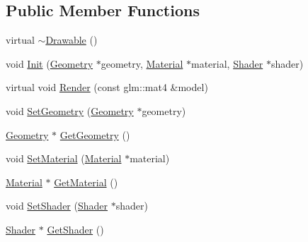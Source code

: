 \subsection*{Public Member Functions}
\begin{DoxyCompactItemize}
\item 
virtual \mbox{\hyperlink{classngl_1_1_drawable_a4c53e2d708da24da5d2a0222f54fa75d}{$\sim$\+Drawable}} ()
\item 
void \mbox{\hyperlink{classngl_1_1_drawable_a8e19b42f9c9e8ebab1e6781dea3fdd34}{Init}} (\mbox{\hyperlink{classngl_1_1_geometry}{Geometry}} $\ast$geometry, \mbox{\hyperlink{classngl_1_1_material}{Material}} $\ast$material, \mbox{\hyperlink{classngl_1_1_shader}{Shader}} $\ast$shader)
\item 
virtual void \mbox{\hyperlink{classngl_1_1_drawable_a2f4d315d693b759a9b427977ef503c39}{Render}} (const glm\+::mat4 \&model)
\item 
void \mbox{\hyperlink{classngl_1_1_drawable_a92fc7514130187ae6fa4e7754bcbf068}{Set\+Geometry}} (\mbox{\hyperlink{classngl_1_1_geometry}{Geometry}} $\ast$geometry)
\item 
\mbox{\hyperlink{classngl_1_1_geometry}{Geometry}} $\ast$ \mbox{\hyperlink{classngl_1_1_drawable_a5bb6a27edfcc7d5416833f6413282507}{Get\+Geometry}} ()
\item 
void \mbox{\hyperlink{classngl_1_1_drawable_a47c85d6217f8690704eb10ae0d8579b8}{Set\+Material}} (\mbox{\hyperlink{classngl_1_1_material}{Material}} $\ast$material)
\item 
\mbox{\hyperlink{classngl_1_1_material}{Material}} $\ast$ \mbox{\hyperlink{classngl_1_1_drawable_af24fe0143a14c1ee5e1920b2d2795406}{Get\+Material}} ()
\item 
void \mbox{\hyperlink{classngl_1_1_drawable_ac0ac2e82018a964140412a60d9405456}{Set\+Shader}} (\mbox{\hyperlink{classngl_1_1_shader}{Shader}} $\ast$shader)
\item 
\mbox{\hyperlink{classngl_1_1_shader}{Shader}} $\ast$ \mbox{\hyperlink{classngl_1_1_drawable_a81edf65e62d4405757981d12ad05a4ae}{Get\+Shader}} ()
\end{DoxyCompactItemize}
